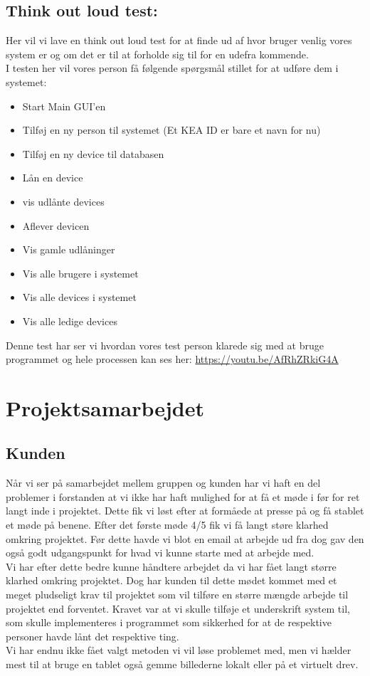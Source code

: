\documentclass[a4paper]{article}
\begin{document}
\subsection{Think out loud test:}
Her vil vi lave en think out loud test for at finde ud af hvor bruger venlig vores system er og om det er til at forholde sig til for en udefra kommende.\\
I testen her vil vores person få følgende spørgsmål stillet for at udføre dem i systemet:\\[0.2in]
\begin{itemize}
\item Start Main GUI'en
\item Tilføj en ny person til systemet (Et KEA ID er bare et navn for nu)
\item Tilføj en ny device til databasen
\item Lån en device
\item vis udlånte devices
\item Aflever devicen
\item Vis gamle udlåninger
\item Vis alle brugere i systemet
\item Vis alle devices i systemet
\item Vis alle ledige devices
\end{itemize}
Denne test har ser vi hvordan vores test person klarede sig med at bruge programmet og hele processen kan ses her: \url{https://youtu.be/AfRhZRkiG4A}
\newpage
\section{Projektsamarbejdet}
\subsection{Kunden}
Når vi ser på samarbejdet mellem gruppen og kunden har vi haft en del problemer i forstanden at vi ikke har haft mulighed for at få et møde i før for ret langt inde i projektet. Dette fik vi løst efter at formåede at presse på og få stablet et møde på benene. Efter det første møde 4/5 fik vi få langt støre klarhed omkring projektet. Før dette havde vi blot en email at arbejde ud fra dog gav den også godt udgangspunkt for hvad vi kunne starte med at arbejde med.\\
Vi har efter dette bedre kunne håndtere arbejdet da vi har fået langt større klarhed omkring projektet. Dog har kunden til dette mødet kommet med et meget pludseligt krav til projektet som vil tilføre en større mængde arbejde til projektet end forventet. Kravet var at vi skulle tilføje et underskrift system til, som skulle implementeres i programmet som sikkerhed for at de respektive personer havde lånt det respektive ting.\\
Vi har endnu ikke fået valgt metoden vi vil løse problemet med, men vi hælder mest til at bruge en tablet også gemme billederne lokalt eller på et virtuelt drev.\\
\end{document}
